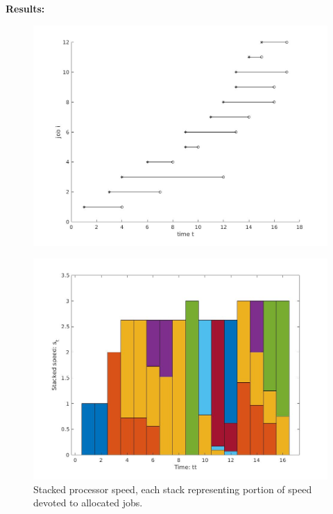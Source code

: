 \documentclass[12pt]{article}
\begin{document}
\textbf{Results:}\\
\begin{figure}[h]
\centering
\includegraphics[scale=.25]{Problem_16_5_1.jpg}
\end{figure}
\begin{figure}[h]
\centering
\includegraphics[scale=.25]{Problem_16_5_2.jpg}
\caption{Stacked processor speed, each stack representing portion of speed devoted to allocated jobs.}
\end{figure}
\end{document}
